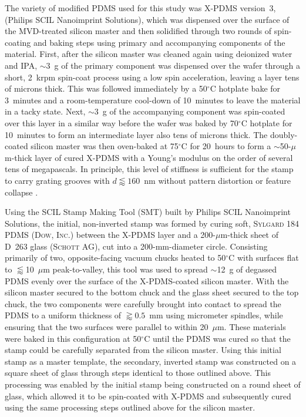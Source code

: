 \documentclass{osa-article}
\begin{document}
The variety of modified PDMS used for this study was X-PDMS version~3, (Philips SCIL Nanoimprint Solutions), which was dispensed over the surface of the MVD-treated silicon master and then solidified through two rounds of spin-coating and baking steps using primary and accompanying components of the material. 
First, after the silicon master was cleaned again using deionized water and IPA, $\sim$3~g of the primary component was dispensed over the wafer through a short, 2~krpm spin-coat process using a low spin acceleration, leaving a layer tens of microns thick. 
This was followed immediately by a 50$^{\circ}$C hotplate bake for 3~minutes and a room-temperature cool-down of 10~minutes to leave the material in a tacky state. 
Next, $\sim$3~g of the accompanying component was spin-coated over this layer in a similar way before the wafer was baked by 70$^{\circ}$C hotplate for 10~minutes to form an intermediate layer also tens of microns thick. 
The doubly-coated silicon master was then oven-baked at 75$^{\circ}$C for 20~hours to form a $\sim$50-$\mu$m-thick layer of cured X-PDMS with a Young's modulus on the order of several tens of megapascals. 
In principle, this level of stiffness is sufficient for the stamp to carry grating grooves with $d \lessapprox 160$~nm without pattern distortion or feature collapse \cite{Verschuuren17,Verschuuren19}. 

Using the SCIL Stamp Making Tool (SMT) built by Philips SCIL Nanoimprint Solutions, the initial, non-inverted stamp was formed by curing soft, \textsc{Sylgard 184} PDMS (\textsc{Dow, Inc.}) between the X-PDMS layer and a 200-$\mu$m-thick sheet of D~263 glass (\textsc{Schott AG}), cut into a 200-mm-diameter circle. 
Consisting primarily of two, opposite-facing vacuum chucks heated to 50$^{\circ}$C with surfaces flat to $\lessapprox$10~$\mu$m peak-to-valley, this tool was used to spread $\sim$12~g of degassed PDMS evenly over the surface of the X-PDMS-coated silicon master. 
With the silicon master secured to the bottom chuck and the glass sheet secured to the top chuck, the two components were carefully brought into contact to spread the PDMS to a uniform thickness of $\gtrapprox 0.5$~mm using micrometer spindles, while ensuring that the two surfaces were parallel to within 20~$\mu$m.  
These materials were baked in this configuration at 50$^{\circ}$C until the PDMS was cured so that the stamp could be carefully separated from the silicon master. 
Using this initial stamp as a master template, the secondary, inverted stamp was constructed on a square sheet of glass through steps identical to those outlined above. 
This processing was enabled by the initial stamp being constructed on a round sheet of glass, which allowed it to be spin-coated with X-PDMS and subsequently cured using the same processing steps outlined above for the silicon master. 
\end{document}
